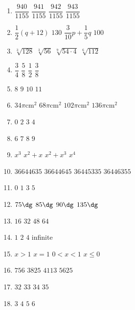 \documentclass[10pt,paper=letter]{scrartcl}
\begin{document}
\begin{enumerate}

\item \fourch
{$\dfrac{940}{1155}$}
{$\dfrac{941}{1155}$}
{$\dfrac{942}{1155}$}
{$\dfrac{943}{1155}$}

\item \fourch
{$\dfrac{1}{2}(q + 12)$}
{$130$}
{$\dfrac{3}{10}p + \dfrac{1}{5}q$}
{$100$}

\item \fourch
{$\sqrt[3]{128}$}
{$\sqrt[3]{56}$}
{$\sqrt[9]{54\cdot 4}$}
{$\sqrt[6]{112}$}

\item \fourch
{$\dfrac{3}{4}$}
{$\dfrac{5}{8}$}
{$\dfrac{1}{2}$}
{$\dfrac{3}{8}$}

\item \fourch
{$8$}
{$9$}
{$10$}
{$11$}

\item \fourch
{$34\pi \text{cm}^2$}
{$68\pi \text{cm}^2$}
{$102\pi \text{cm}^2$}
{$136\pi \text{cm}^2$}

\item \fourch
{$0$}
{$2$}
{$3$}
{$4$}

\item \fourch
{$6$}
{$7$}
{$8$}
{$9$}

\item \fourch
{$x^3$}
{$x^2+x$}
{$x^2+x^3$}
{$x^4$}

\item \fourch
{$36644635$}
{$36644645$}
{$36445335$}
{$36446355$}

\item \fourch
{$0$}
{$1$}
{$3$}
{$5$}

\item \fourch
{$75\dg$}
{$85\dg$}
{$90\dg$}
{$135\dg$}

\item \fourch
{$16$}
{$32$}
{$48$}
{$64$}

\item \fourch
{$1$}
{$2$}
{$4$}
{infinite}

\item \fourch
{$x>1$}
{$x=1$}
{$0<x<1$}
{$x\leq 0$}

\item \fourch
{$756$}
{$3825$}
{$4113$}
{$5625$}

\item \fourch
{$32$}
{$33$}
{$34$}
{$35$}

\item \fourch
{$3$}
{$4$}
{$5$}
{$6$}


\end{enumerate}
\end{document}
